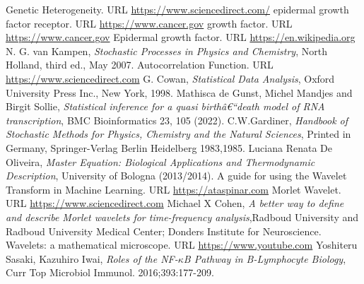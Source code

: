 \documentclass[12pt,a4paper]{report}
\begin{document}
\begin{thebibliography}{bibliography}
     Genetic Heterogeneity. URL \href{https://www.sciencedirect.com/topics/biochemistry-genetics-and-molecular-biology/genetic-heterogeneity}{https://www.sciencedirect.com/}
     epidermal growth factor receptor. URL \href{https://www.cancer.gov/publications/dictionaries/cancer-terms/def/epidermal-growth-factor-receptor}{https://www.cancer.gov}
     growth factor. URL \href{https://www.cancer.gov/publications/dictionaries/cancer-terms/def/growth-factor}{https://www.cancer.gov}
     Epidermal growth factor. URL \href{https://en.wikipedia.org/wiki/Epidermal_growth_factor}{https://en.wikipedia.org}
     N. G. van Kampen, {\em Stochastic Processes in Physics and Chemistry}, North Holland, third ed., May 2007.
     Autocorrelation Function. URL \href{https://www.sciencedirect.com/topics/chemistry/autocorrelation-function#:~:text=1%20Autocorrelation-,The%20autocorrelation%20function%20(ACF)%20defines%20how%20data%20points%20in%20a,signal%20over%20different%20delay%20times.}{https://www.sciencedirect.com}
     G. Cowan, {\em Statistical Data Analysis}, Oxford University Press Inc., New York, 1998.
     Mathisca de Gunst, Michel Mandjes and Birgit Sollie, {\em Statistical inference for a quasi birthâ€“death model of RNA transcription}, BMC Bioinformatics 23, 105 (2022).
     C.W.Gardiner, {\em Handbook of Stochastic Methods for Physics, Chemistry and the Natural Sciences}, Printed in Germany, Springer-Verlag Berlin Heidelberg 1983,1985.
     Luciana Renata De Oliveira, {\em Master Equation: Biological Applications and Thermodynamic Description}, University of Bologna (2013/2014).
      A guide for using the Wavelet Transform in Machine Learning. URL \href{https://ataspinar.com/2018/12/21/a-guide-for-using-the-wavelet-transform-in-machine-learning/}{https://ataspinar.com}
     Morlet Wavelet. URL \href{https://www.sciencedirect.com/topics/mathematics/morlet-wavelet}{https://www.sciencedirect.com}
     Michael X Cohen, {\em A better way to define and describe Morlet wavelets
    for time-frequency analysis},Radboud University and Radboud University Medical Center; Donders Institute for Neuroscience.
     Wavelets: a mathematical microscope. URL \href{https://www.youtube.com/watch?v=jnxqHcObNK4&t=1320s}{https://www.youtube.com}
     Yoshiteru Sasaki, Kazuhiro Iwai, {\em Roles of the NF-$\kappa$B Pathway in B-Lymphocyte Biology}, Curr Top Microbiol Immunol. 2016;393:177-209.

\end{thebibliography}
\end{document}
